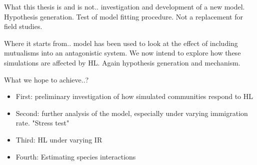 What this thesis is and is not.. investigation and development of a new model. Hypothesis generation. Test of model fitting procedure. Not a replacement for field studies.

Where it starts from.. model has been used to look at the effect of including mutualisms into an antagonistic system. We now intend to explore how these simulations are affected by HL. Again hypothesis generation and mechanism.

What we hope to achieve..?

\begin{itemize}
	\item First: preliminary investigation of how simulated communities respond to HL
	\item Second: further analysis of the model, especially under varying immigration rate. "Stress test"
	\item Third: HL under varying IR
	\item Fourth: Estimating species interactions
\end{itemize}


